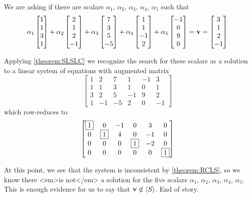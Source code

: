 \documentclass{ximera}
\begin{document}
\begin{example}
\begin{question}
    \begin{hint}
      We are asking if there are scalars $\alpha_1,\,\alpha_2,\,\alpha_3,\,\alpha_4,\,\alpha_5$ such that
      \[
        \alpha_1\begin{bmatrix}1 \\ 1 \\ 3 \\ 1\end{bmatrix}+
        \alpha_2\begin{bmatrix}2 \\ 1 \\ 2 \\ -1\end{bmatrix}+
        \alpha_3\begin{bmatrix}7 \\ 3 \\ 5 \\ -5\end{bmatrix}+
        \alpha_4\begin{bmatrix}1 \\ 1 \\ -1 \\ 2\end{bmatrix}+
        \alpha_5\begin{bmatrix}-1 \\ 0 \\ 9 \\ 0\end{bmatrix}
        =\mathbf{v}
        =\begin{bmatrix}3\\1\\2\\-1\end{bmatrix}
      \]
    \end{hint}
    
    \begin{multipleChoice}
    \end{multipleChoice}

    \begin{feedback}[correct]
      Applying \ref{theorem:SLSLC} we recognize the search for these scalars as a solution to a linear system of equations with augmented matrix
      \[
        \begin{bmatrix}
          1 & 2 & 7 & 1 & -1 & 3 \\
          1 & 1 & 3 & 1 & 0 & 1 \\
          3 & 2 & 5 & -1 & 9 & 2 \\
          1 & -1 & -5 & 2 & 0 & -1
        \end{bmatrix}
      \]
      which row-reduces to
      \[
        \begin{bmatrix}
          \fbox{1} & 0 & -1 & 0 & 3 & 0 \\
          0 & \fbox{1} & 4 & 0 & -1 & 0 \\
          0 & 0 & 0 & \fbox{1} & -2 & 0 \\
          0 & 0 & 0 & 0 & 0 & \fbox{1}
        \end{bmatrix}
      \]

      At this point, we see that the system is inconsistent by
      \ref{theorem:RCLS}, so we know there <em>is not</em> a solution
      for the five scalars
      $\alpha_1,\,\alpha_2,\,\alpha_3,\,\alpha_4,\,\alpha_5$.  This is
      enough evidence for us to say that $\mathbf{v}\not\in\left\langle S\right\rangle$.
      End of story.
    \end{feedback}
  \end{question}
\end{example}
\end{document}
